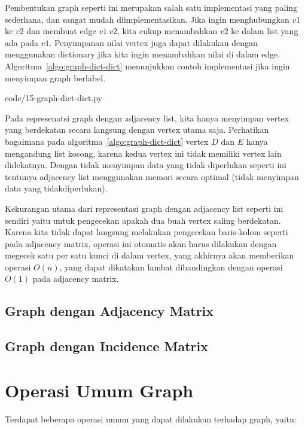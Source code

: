 Pembentukan graph seperti ini merupakan salah satu implementasi yang paling sederhana, dan sangat mudah diimplementasikan. Jika ingin menghubungkan $v1$ ke $v2$ dan membuat edge $v1 ~ v2$, kita cukup menambahkan $v2$ ke dalam list yang ada pada $v1$. Penyimpanan nilai vertex juga dapat dilakukan dengan menggunakan dictionary jika kita ingin menambahkan nilai di dalam edge. Algoritma~\ref{algo:graph-dict-dict} menunjukkan contoh implementasi jika ingin menyimpan graph berlabel.


                {code/15-graph-dict-dict.py}

Pada represenatsi graph dengan adjacency list, kita hanya menyimpan vertex yang berdekatan secara langsung dengan vertex utama saja. Perhatikan bagaimana pada algoritma~\ref{algo:graph-dict-dict} vertex $D$ dan $E$ hanya mengandung list kosong, karena kedua vertex ini tidak memiliki vertex lain didekatnya. Dengan tidak menyimpan data yang tidak diperlukan seperti ini tentunya adjacency list menggunakan memori secara optimal (tidak menyimpan data yang tidakdiperlukan).

Kekurangan utama dari representasi graph dengan adjacency list seperti ini sendiri yaitu untuk pengecekan apakah dua buah vertex saling berdekatan. Karena kita tidak dapat langsung melakukan pengecekan baris-kolom seperti pada adjacency matrix, operasi ini otomatis akan harus dilakukan dengan megecek satu per satu kunci di dalam vertex, yang akhirnya akan memberikan operasi $O(n)$, yang dapat dikatakan lambat dibandingkan dengan operasi $O(1)$ pada adjacency matrix.

\subsection{Graph dengan Adjacency Matrix}

\subsection{Graph dengan Incidence Matrix}

\section{Operasi Umum Graph}

Terdapat beberapa operasi umum yang dapat dilakukan terhadap graph, yaitu:

